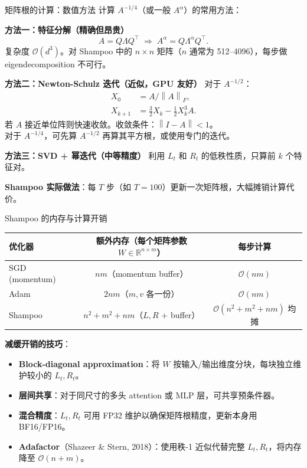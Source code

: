 \documentclass[aspectratio=169,10pt]{ctexbeamer}
\newcommand{\R}{\mathbb{R}}
\newcommand{\norm}[1]{\left\lVert #1 \right\rVert}
\begin{document}
\begin{frame}{矩阵根的计算：数值方法}
计算 $A^{-1/4}$（或一般 $A^\alpha$）的常用方法：

\vspace{.2cm}
\textbf{方法一：特征分解（精确但昂贵）}
\[
  A=Q\Lambda Q^\top\;\Longrightarrow\; A^\alpha=Q\Lambda^\alpha Q^\top.
\]
复杂度 $\mathcal{O}(d^3)$。对 Shampoo 中的 $n\times n$ 矩阵（$n$ 通常为 512--4096），每步做 eigendecomposition 不可行。

\vspace{.2cm}
\textbf{方法二：Newton-Schulz 迭代（近似，GPU 友好）}
对于 $A^{-1/2}$：
\[
  \begin{aligned}
  X_0 &= A/\norm{A}_F,\\
  X_{k+1} &= \tfrac{3}{2}X_k-\tfrac{1}{2}X_k^3A.
  \end{aligned}
\]
若 $A$ 接近单位阵则快速收敛。收敛条件：$\norm{I-A}<1$。\\
对于 $A^{-1/4}$，可先算 $A^{-1/2}$ 再算其平方根，或使用专门的迭代。

\vspace{.2cm}
\textbf{方法三：SVD + 幂迭代（中等精度）}
利用 $L_t$ 和 $R_t$ 的低秩性质，只算前 $k$ 个特征对。

\vspace{.25cm}
\textbf{Shampoo 实际做法}：每 $T$ 步（如 $T=100$）更新一次矩阵根，大幅摊销计算代价。
\end{frame}

\begin{frame}{Shampoo 的内存与计算开销}
\begin{tabular}{lcc}
\toprule
优化器 & 额外内存（每个矩阵参数 $W\in\R^{n\times m}$） & 每步计算 \\
\midrule
SGD (momentum) & $nm$（momentum buffer） & $\mathcal{O}(nm)$  \\
Adam & $2nm$（$m,v$ 各一份） & $\mathcal{O}(nm)$ \\
Shampoo & $n^2+m^2+nm$（$L,R$ + buffer） & $\mathcal{O}(n^2+m^2+nm)$ 均摊\\
\bottomrule
\end{tabular}

\vspace{.3cm}
\textbf{减缓开销的技巧}：
\begin{itemize}
  \item \textbf{Block-diagonal approximation}：将 $W$ 按输入/输出维度分块，每块独立维护较小的 $L_t,R_t$。
  \item \textbf{层间共享}：对于同尺寸的多头 attention 或 MLP 层，可共享预条件器。
  \item \textbf{混合精度}：$L_t,R_t$ 可用 FP32 维护以确保矩阵根精度，更新本身用 BF16/FP16。
  \item \textbf{Adafactor}（Shazeer \& Stern, 2018）：使用秩-1 近似代替完整 $L_t,R_t$，将内存降至 $\mathcal{O}(n+m)$。
\end{itemize}
\end{frame}
\end{document}
